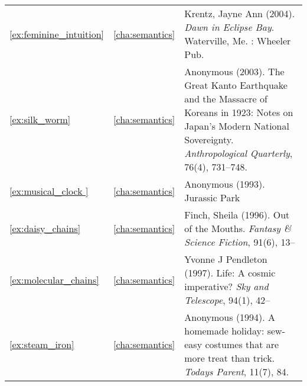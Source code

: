 \begin{longtable}{lcp{8.5cm}}
\ref{ex:feminine_intuition}&\ref{cha:semantics}&Krentz, Jayne Ann (2004). \emph{Dawn in Eclipse Bay}. Waterville, Me. : Wheeler Pub.\\
\ref{ex:silk_worm}&\ref{cha:semantics}&Anonymous (2003). The Great Kanto Earthquake and the Massacre of Koreans in 1923: Notes on Japan's Modern National Sovereignty. \emph{Anthropological Quarterly}, 76(4), 731--748.\\
\ref{ex:musical_clock }&\ref{cha:semantics}&Anonymous (1993). Jurassic Park\\
\ref{ex:daisy_chains}&\ref{cha:semantics}&Finch, Sheila (1996). Out of the Mouths. \emph{Fantasy \& Science Fiction}, 91(6), 13--\\
\ref{ex:molecular_chains}&\ref{cha:semantics}&Yvonne J Pendleton (1997). Life: A cosmic imperative? \emph{Sky and Telescope}, 94(1), 42--\\
\ref{ex:steam_iron}&\ref{cha:semantics}&Anonymous (1994). A homemade holiday: sew-easy costumes that are more treat than trick. \emph{Todays Parent}, 11(7), 84.\\

\end{longtable}
